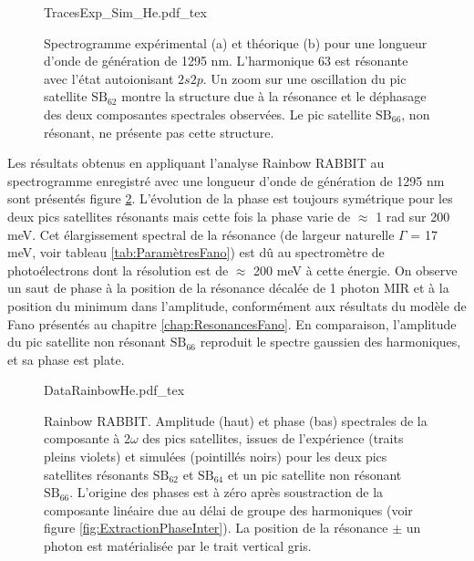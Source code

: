 \begin{figure}
\centering
\def\svgwidth{\textwidth}
{TracesExp_Sim_He.pdf_tex}
\caption{Spectrogramme expérimental (a) et théorique (b) pour une longueur d'onde de génération de 1295 nm. L'harmonique 63 est résonante avec l'état autoionisant $2s2p$. Un zoom sur une oscillation du pic satellite $\text{SB}_{62}$ montre la structure due à la résonance et le déphasage des deux composantes spectrales observées. Le pic satellite $\text{SB}_{66}$, non résonant, ne présente pas cette structure.}
\label{fig:TracesExp_Sim_He}
\end{figure}

Les résultats obtenus en appliquant l'analyse Rainbow RABBIT au spectrogramme enregistré avec une longueur d'onde de génération de 1295 nm sont présentés figure \ref{fig:DataRainbowHe}. L'évolution de la phase est toujours symétrique pour les deux pics satellites résonants mais cette fois la phase varie de $\approx$ 1 rad sur 200 meV. Cet élargissement spectral de la résonance (de largeur naturelle $\Gamma$ = 17 meV, voir tableau \ref{tab:ParamètresFano}) est dû au spectromètre de photoélectrons dont la résolution est de $\approx$ 200 meV à cette énergie. On observe un saut de phase à la position de la résonance décalée de 1 photon MIR et à la position du minimum dans l'amplitude, conformément aux résultats du modèle de Fano présentés au chapitre \ref{chap:ResonancesFano}. En comparaison, l'amplitude du pic satellite non résonant $\text{SB}_{66}$ reproduit le spectre gaussien des harmoniques, et sa phase est plate.

\begin{figure}
\centering
\def\svgwidth{\textwidth}
{DataRainbowHe.pdf_tex}
\caption{Rainbow RABBIT. Amplitude (haut) et phase (bas) spectrales de la composante à 2$\omega$ des pics satellites, issues de l'expérience (traits pleins violets) et simulées (pointillés noirs) pour les deux pics satellites résonants $\text{SB}_{62}$ et $\text{SB}_{64}$ et un pic satellite non résonant $\text{SB}_{66}$. L'origine des phases est à zéro après soustraction de la composante linéaire due au délai de groupe des harmoniques (voir figure \ref{fig:ExtractionPhaseInter}). La position de la résonance $\pm$ un photon est matérialisée par le trait vertical gris.} 
\label{fig:DataRainbowHe}
\end{figure}

